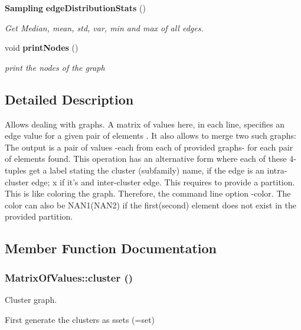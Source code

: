 \begin{CompactItemize}
\item 
{\bf Sampling} {\bf edge\-Distribution\-Stats} ()
\begin{CompactList}\small\item\em Get Median, mean, std, var, min and max of all edges. \item\end{CompactList}\item 
void {\bf print\-Nodes} ()\label{classMatrixOfValues_a30}

\begin{CompactList}\small\item\em print the nodes of the graph \item\end{CompactList}\end{CompactItemize}


\subsection{Detailed Description}
Allows dealing with graphs. A matrix of values here, in each line, specifies an edge value for a given pair of elements . It also allows to merge two such graphs: The output is a pair of values -each from each of provided graphs- for each pair of elements found. This operation has an alternative form where each of these 4-tuples get a label stating the cluster (subfamily) name, if the edge is an intra-cluster edge; x if it's and inter-cluster edge. This requires to provide a partition. This is like coloring the graph. Therefore, the command line option -color. The color can also be NAN1(NAN2) if the first(second) element does not exist in the provided partition. 



\subsection{Member Function Documentation}
\subsubsection{ Matrix\-Of\-Values::cluster ()}\label{classMatrixOfValues_a9}


Cluster graph. 

First generate the clusters as ssets (=set)

